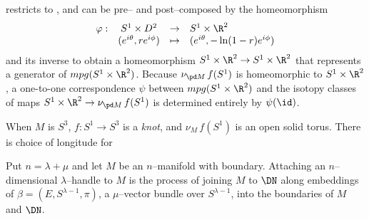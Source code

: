 restricts to , and can be pre-- and post--composed by the homeomorphism
\[
\begin{array}{cccl}
\varphi: & S^1\times D^2 & \to & S^1\times \R^2 \\
& (e^{i\theta}, re^{i\phi}) & \mapsto & (e^{i\theta}, -\ln(1-r)e^{i\phi})
\end{array}	
\]
and its inverse to obtain a homeomorphism $S^1\times \R^2\to S^1\times \R^2$ that represents a generator of $mpg(S^1\times\R^2)$.
Because $\nu_{\pd M}\,f(S^1)$ is homeomorphic to $S^1\times\R^2$, a one-to-one correspondence
$\psi$ between $mpg(S^1\times\R^2)$ and the isotopy classes of maps $S^1\times\R^2\to\nu_{\pd M}\,f(S^1)$ is determined entirely by $\psi(\id)$.

When $M$ is $S^3$, $f:S^1\to S^3$ is a \emph{knot}, and $\nu_M\,f(S^1)$ is an open solid torus.
There is choice of longitude for 




Put $n=\lambda+\mu$ and let $M$ be an $n$--manifold with boundary.
Attaching an $n$--dimensional $\lambda$--handle to $M$ is the process of joining $M$ to $\DN$ along embeddings of $\beta=(E,S^{\lambda-1},\pi)$, a $\mu$--vector bundle over $S^{\lambda-1}$, into the boundaries of $M$ and $\DN$.


